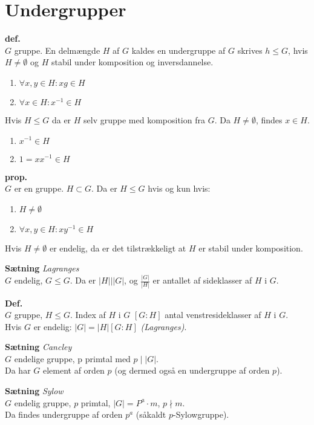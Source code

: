 \documentclass{article}
\begin{document}
\section*{Undergrupper}
\textbf{def.}\\
$G$ gruppe. En delmængde $H$ af $G$ kaldes en undergruppe af $G$ skrives $h \leq G$, hvis $H \neq \emptyset$ og $H$ stabil under komposition og inversdannelse.
\begin{enumerate}
  \item $\forall{x, y} \in H : xg \in H$
  \item $\forall{x} \in H : x^{-1} \in H$
\end{enumerate}
Hvis $H \leq G$ da er $H$ selv gruppe med komposition fra $G$. Da $H \neq \emptyset$, findes $x \in H$.
\begin{enumerate}
  \item $x^{-1} \in H$
  \item $1 = x x^{-1} \in H$
\end{enumerate}
\textbf{prop.}\\
$G$ er en gruppe. $H \subset G$. Da er $H \leq G$ hvis og kun hvis:
\begin{enumerate}
  \item $H \neq \emptyset$
  \item $\forall{x, y} \in H : x y^{-1} \in H$
\end{enumerate}
Hvis $H \neq \emptyset$ er endelig, da er det tilstrækkeligt at $H$ er stabil under komposition.

\textbf{Sætning} \textit{Lagranges}\\
$G$ endelig, $G \leq G$. Da er $|H| | |G|$, og $\frac{|G|}{|H|}$ er antallet af sideklasser af $H$ i $G$.

\textbf{Def.}\\
$G$ gruppe, $H \leq G$. Index af $H$ i $G$ $[G:H]$ antal venstresideklasser af $H$ i $G$.\\
Hvis $G$ er endelig: $|G| = |H| [G:H]$ \textit{(Lagranges)}.

\textbf{Sætning} \textit{Cancley}\\
$G$ endelige gruppe, p primtal med $p \mid |G|$.\\
Da har $G$ element af orden $p$ (og dermed også en undergruppe af orden $p$).

\textbf{Sætning} \textit{Sylow}\\
$G$ endelig gruppe, $p$ primtal, $|G| = P^a \cdot m$, $p \nmid m$.\\
Da findes undergruppe af orden $p^a$ (såkaldt $p$-Sylowgruppe).\\
\end{document}
